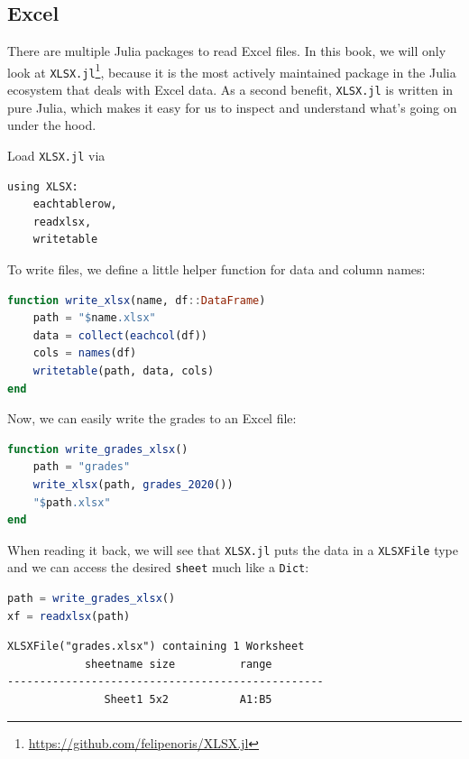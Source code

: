 \documentclass[
  notoc %
]{tufte-book}
\DeclareRobustCommand{\href}[2]{#2\footnote{\url{#1}}}
\newcommand{\passthrough}[1]{#1}
\begin{document}
\hypertarget{sec:excel}{%
\subsection{Excel}\label{sec:excel}}

There are multiple Julia packages to read Excel files. In this book, we
will only look at
\href{https://github.com/felipenoris/XLSX.jl}{\passthrough{\lstinline!XLSX.jl!}},
because it is the most actively maintained package in the Julia
ecosystem that deals with Excel data. As a second benefit,
\passthrough{\lstinline!XLSX.jl!} is written in pure Julia, which makes
it easy for us to inspect and understand what's going on under the hood.

Load \passthrough{\lstinline!XLSX.jl!} via

\begin{lstlisting}
using XLSX:
    eachtablerow,
    readxlsx,
    writetable
\end{lstlisting}

To write files, we define a little helper function for data and column
names:

\begin{lstlisting}[language=Julia]
function write_xlsx(name, df::DataFrame)
    path = "$name.xlsx"
    data = collect(eachcol(df))
    cols = names(df)
    writetable(path, data, cols)
end
\end{lstlisting}

Now, we can easily write the grades to an Excel file:

\begin{lstlisting}[language=Julia]
function write_grades_xlsx()
    path = "grades"
    write_xlsx(path, grades_2020())
    "$path.xlsx"
end
\end{lstlisting}

When reading it back, we will see that \passthrough{\lstinline!XLSX.jl!}
puts the data in a \passthrough{\lstinline!XLSXFile!} type and we can
access the desired \passthrough{\lstinline!sheet!} much like a
\passthrough{\lstinline!Dict!}:

\begin{lstlisting}[language=Julia]
path = write_grades_xlsx()
xf = readxlsx(path)
\end{lstlisting}

\begin{lstlisting}[language=Output]
XLSXFile("grades.xlsx") containing 1 Worksheet
            sheetname size          range        
-------------------------------------------------
               Sheet1 5x2           A1:B5        

\end{lstlisting}
\end{document}
